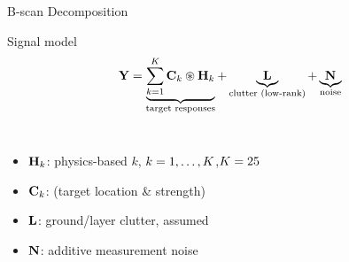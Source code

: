 \begin{frame}{B-scan Decomposition}

  \begin{shibuiframe}{Signal model}
    \[
      \Mimage
        = \underbrace{%
            \sum_{\iatom=1}^{\nbatoms}
              \Mcoef_{\iatom} \Mconv \Matom_{\iatom}%
          }_{\text{target responses}}
        + \underbrace{\Mclutter}_{\text{clutter (low-rank)}}
        + \underbrace{\Mnoise}_{\text{noise}}
    \]
  \end{shibuiframe}

  \vspace{0.5em}

  \begin{columns}[T]
      \vspace{0.3em}
      \begin{itemize}
        \item $\mathbf{H}_{k}$: physics-based  $k$,
              $k = 1,\ldots,K$,\quad $K = 25$
        \item $\mathbf{C}_{k}$: 
              (target location \& strength)
        \item $\mathbf{L}$: ground/layer clutter,
              assumed 
        \item $\mathbf{N}$: additive measurement noise
      \end{itemize}

      \vspace{0.3em}
      \centering
  \end{columns}
\end{frame}

